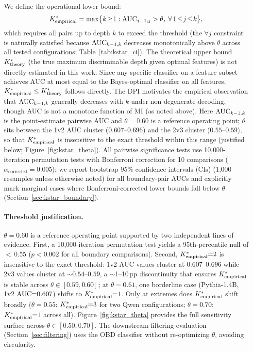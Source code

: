 We define the operational lower bound:
{\small
\begin{equation}
  {K^*_{\text{empirical}}} = \max\bigl\{k \!\geq\! 1 : \text{AUC}_{j-1,j} > \theta,\;\forall\, 1 \!\leq\! j \!\leq\! k\bigr\},
  \label{eq:kstar}
\end{equation}
}
which requires all pairs up to depth $k$ to exceed the threshold (the $\forall j$ constraint is naturally satisfied because $\text{AUC}_{k-1,k}$ decreases monotonically above $\theta$ across all tested configurations; Table~\ref{tab:kstar_ci}).
The theoretical upper bound ${K^*_{\text{theory}}}$ (the true maximum discriminable depth given optimal features) is not directly estimated in this work.
Since any specific classifier on a feature subset achieves AUC at most equal to the Bayes-optimal classifier on all features, ${K^*_{\text{empirical}}} \leq {K^*_{\text{theory}}}$ follows directly.
The DPI motivates the empirical observation that $\text{AUC}_{k-1,k}$ generally decreases with $k$ under non-degenerate decoding, though AUC is not a monotone function of MI (as noted above).
Here $\text{AUC}_{k-1,k}$ is the point-estimate pairwise AUC and $\theta = 0.60$ is a reference operating point; $\theta$ sits between the 1v2 AUC cluster ($0.607$--$0.696$) and the 2v3 cluster ($0.55$--$0.59$), so that ${K^*_{\text{empirical}}}$ is insensitive to the exact threshold within this range (justified below; Figure~\ref{fig:kstar_theta}).
All pairwise significance tests use 10{,}000-iteration permutation tests with Bonferroni correction for 10 comparisons ($\alpha_{\text{corrected}}{=}0.005$); we report bootstrap 95\% confidence intervals (CIs) (1{,}000 resamples unless otherwise noted) for all boundary-pair AUCs and explicitly mark marginal cases where Bonferroni-corrected lower bounds fall below $\theta$ (Section~\ref{sec:kstar_boundary}).

\paragraph{Threshold justification.}
$\theta{=}0.60$ is a reference operating point supported by two independent lines of evidence.
First, a 10{,}000-iteration permutation test yields a 95th-percentile null of ${<}\,0.55$ ($p < 0.002$ for all boundary comparisons).
Second, ${K^*_{\text{empirical}}}{=}2$ is insensitive to the exact threshold: 1v2 AUC values cluster at $0.607$--$0.696$ while 2v3 values cluster at ${\sim}0.54$--$0.59$, a ${\sim}$1--10\,pp discontinuity that ensures ${K^*_{\text{empirical}}}$ is stable across $\theta \in [0.59, 0.60]$; at $\theta{=}0.61$, one borderline case (Pythia-1.4B, 1v2 $\text{AUC}{=}0.607$) shifts to ${K^*_{\text{empirical}}}{=}1$.
Only at extremes does ${K^*_{\text{empirical}}}$ shift broadly ($\theta{=}0.55$: ${K^*_{\text{empirical}}}{=}3$ for two Qwen configurations; $\theta{=}0.70$: ${K^*_{\text{empirical}}}{=}1$ across all).
Figure~\ref{fig:kstar_theta} provides the full sensitivity surface across $\theta \in [0.50, 0.70]$.
The downstream filtering evaluation (Section~\ref{sec:filtering}) uses the OBD classifier without re-optimizing $\theta$, avoiding circularity.

